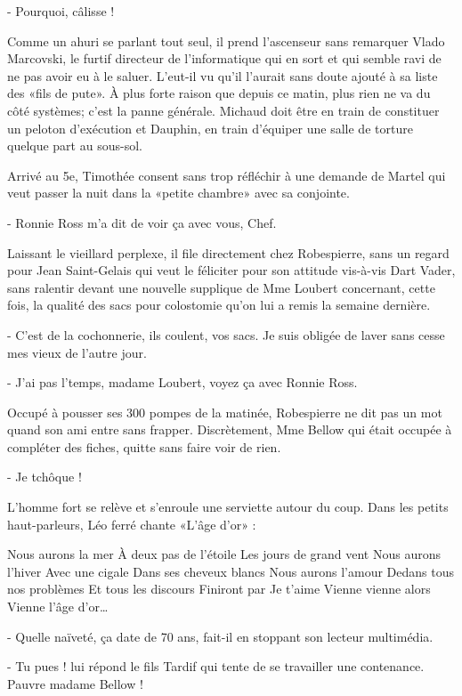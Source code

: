- Pourquoi, câlisse !

Comme un ahuri se parlant tout seul, il prend l’ascenseur sans remarquer Vlado Marcovski, le furtif directeur de l’informatique qui en sort et qui semble ravi de ne pas avoir eu à le saluer. L’eut-il vu qu’il l’aurait sans doute ajouté à sa liste des «fils de pute». À plus forte raison que depuis ce matin, plus rien ne va du côté systèmes; c’est la panne générale. Michaud doit être en train de constituer un peloton d’exécution et Dauphin, en train d’équiper une salle de torture quelque part au sous-sol.

Arrivé au 5e, Timothée consent sans trop réfléchir à une demande de Martel qui veut passer la nuit dans la «petite chambre» avec sa conjointe.

- Ronnie Ross m’a dit de voir ça avec vous, Chef.

Laissant le vieillard perplexe, il file directement chez Robespierre, sans un regard pour Jean Saint-Gelais qui veut le féliciter pour son attitude vis-à-vis Dart Vader, sans ralentir devant une nouvelle supplique de Mme Loubert concernant, cette fois, la qualité des sacs pour colostomie qu’on lui a remis la semaine dernière.

- C’est de la cochonnerie, ils coulent, vos sacs. Je suis obligée de laver sans cesse mes vieux de l’autre jour.

- J’ai pas l’temps, madame Loubert, voyez ça avec Ronnie Ross.

Occupé à pousser ses 300 pompes de la matinée, Robespierre ne dit pas un mot quand son ami entre sans frapper. Discrètement, Mme Bellow qui était occupée à compléter des fiches, quitte sans faire voir de rien.

- Je tchôque !

L’homme fort se relève et s’enroule une serviette autour du coup. Dans les petits haut-parleurs, Léo ferré chante «L’âge d’or» :

    Nous aurons la mer
    À deux pas de l’étoile
    Les jours de grand vent
    Nous aurons l’hiver
    Avec une cigale
    Dans ses cheveux blancs
    Nous aurons l’amour
    Dedans tous nos problèmes
    Et tous les discours
    Finiront par Je t’aime
    Vienne vienne alors
    Vienne l’âge d’or…

- Quelle naïveté, ça date de 70 ans, fait-il en stoppant son lecteur multimédia.

- Tu pues ! lui répond le fils Tardif qui tente de se travailler une contenance. Pauvre madame Bellow !

